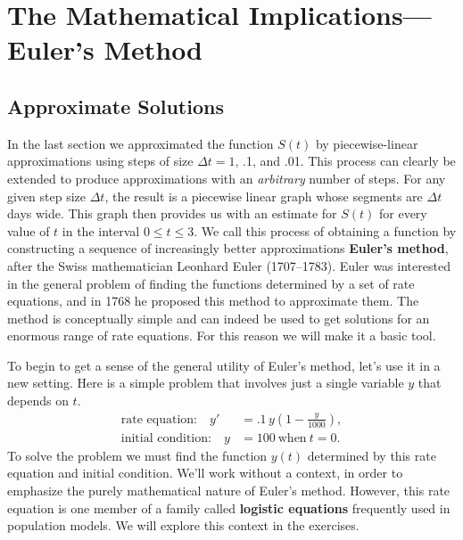 \section{The Mathematical Implications---\\Euler's Method}
\label{sec:the-mathematical-implications---eulers-method}

\subsection{Approximate Solutions}
\label{subsec:approximate-solutions}

In the last section we approximated the function $S(t)$ by
piecewise-linear approximations using steps of size $\Delta t =1$, .1,
and .01. This process can clearly be extended to produce
approximations with an {\em arbitrary\/} number of steps. For any
given step size $\Delta t$, the result is a piecewise linear graph
whose segments are $\Delta t$ days wide. This graph then provides us
with an estimate for $S(t)$ for every value of $t$ in the interval $0
\leq t \leq 3$. We call this process of obtaining a function by
constructing a sequence of increasingly better approximations {\bf
  Euler's method}, after the Swiss mathematician Leonhard Euler
(1707--1783). Euler was interested in the general problem
of finding the functions determined by a set of rate equations, and in
1768 he proposed this method to approximate them. The method is
conceptually simple and can indeed be used to get solutions for an
enormous range of rate equations.  For this reason we will make it a
basic tool.

To begin to get a sense of the general utility of Euler's method,
let's use it in a new setting.  Here is a simple problem that involves
just a single variable $y$ that depends on $t$.
\begin{align*}
\mbox{rate equation:}\quad y' &= 
	{\displaystyle .1\,y \left( 1-\frac{y}{1000} \right)}, \\
\mbox{initial condition:}\quad  y &= 100 \ 
		\mbox{when} \ t = 0.
\end{align*}
To solve the problem we must find the function $y(t)$ determined by
this rate equation and initial condition. We'll work without a
context, in order to emphasize the purely mathematical nature of
Euler's method. However, this rate equation is one member of a family
called {\bf logistic equations}\label{logistic-begin} frequently used in population
models.  We will explore this context in the exercises.

